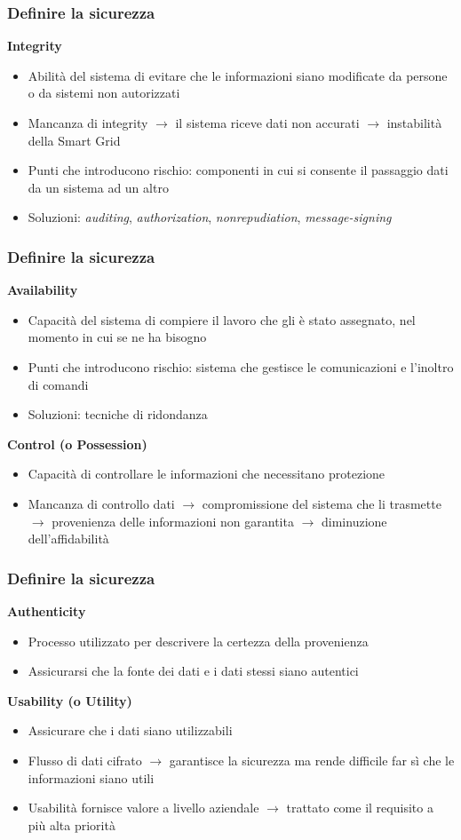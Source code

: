\begin{frame}
  \frametitle{Definire la sicurezza}
   \textbf{Integrity}
  	\begin{itemize}[<+- | alert@+>]
  	\item Abilità del sistema di evitare che le informazioni siano modificate da persone o da sistemi non autorizzati
  	\item Mancanza di integrity $\rightarrow$ il sistema riceve dati non accurati $\rightarrow$ instabilità della Smart Grid
  	\item Punti che introducono rischio: componenti in cui si consente il passaggio dati da un sistema ad un altro
  	\item Soluzioni: \textit{auditing}, \textit{authorization}, \textit{nonrepudiation}, \textit{message-signing}
  	\end{itemize}
\end{frame}

\begin{frame}
  \frametitle{Definire la sicurezza}
   \textbf{Availability}
  	\begin{itemize}[<+- | alert@+>]
  	\item Capacità del sistema di compiere il lavoro che gli è stato assegnato, nel momento in cui se ne ha bisogno 
  	\item Punti che introducono rischio: sistema che gestisce le comunicazioni e l'inoltro di comandi
  	\item Soluzioni: tecniche di ridondanza
  	\end{itemize}
  	\pause
   \textbf{Control (o Possession)}
  	\begin{itemize}[<+- | alert@+>]
  	\item Capacità di controllare le informazioni che necessitano protezione
  	\item Mancanza di controllo dati $\rightarrow$  compromissione del sistema che li trasmette $\rightarrow$ provenienza delle informazioni non garantita $\rightarrow$ diminuzione dell'affidabilità
  	\end{itemize}
\end{frame}

\begin{frame}
  \frametitle{Definire la sicurezza}
   \textbf{Authenticity}
  	\begin{itemize}[<+- | alert@+>]
  	\item Processo utilizzato per descrivere la certezza della provenienza
  	\item Assicurarsi che la fonte dei dati e i dati stessi siano autentici
  	\end{itemize}
  	\pause
  \textbf{Usability (o Utility)}
  \begin{itemize}[<+- | alert@+>]
  \item Assicurare che i dati siano utilizzabili
  \item Flusso di dati cifrato $\rightarrow$ garantisce la sicurezza ma rende difficile far sì che le informazioni siano utili
  \item Usabilità fornisce valore a livello aziendale $\rightarrow$ trattato come il requisito a più alta priorità
  \end{itemize}
\end{frame}

